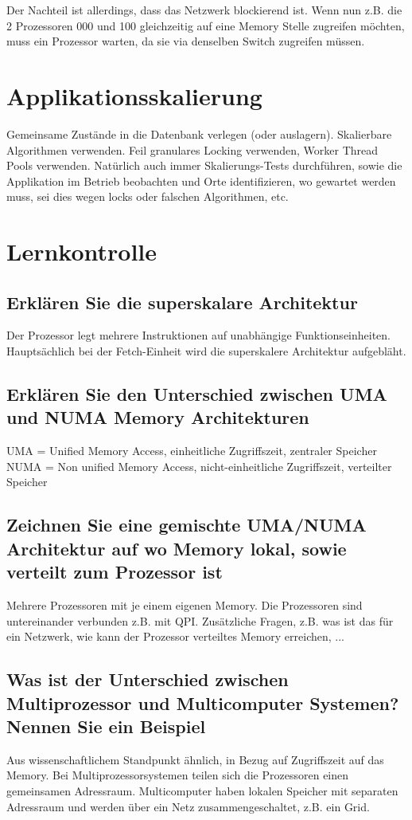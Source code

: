 Der Nachteil ist allerdings, dass das Netzwerk blockierend ist. Wenn nun z.B. die 2 Prozessoren 000 und 100 gleichzeitig auf eine Memory Stelle zugreifen möchten, muss ein Prozessor warten, da sie via denselben Switch zugreifen müssen.
\section{Applikationsskalierung}
Gemeinsame Zustände in die Datenbank verlegen (oder auslagern). Skalierbare Algorithmen verwenden. Feil granulares Locking verwenden, Worker Thread Pools verwenden. Natürlich auch immer Skalierungs-Tests durchführen, sowie die Applikation im Betrieb beobachten und Orte identifizieren, wo gewartet werden muss, sei dies wegen locks oder falschen Algorithmen, etc.
\section{Lernkontrolle}
\subsection{Erklären Sie die superskalare Architektur}
Der Prozessor legt mehrere Instruktionen auf unabhängige Funktionseinheiten.
Hauptsächlich bei der Fetch-Einheit wird die superskalere Architektur aufgebläht.
\subsection{Erklären Sie den Unterschied zwischen UMA und NUMA Memory Architekturen}
UMA = Unified Memory Access, einheitliche Zugriffszeit, zentraler Speicher
NUMA = Non unified Memory Access, nicht-einheitliche Zugriffszeit, verteilter Speicher
\subsection{Zeichnen Sie eine gemischte UMA/NUMA Architektur auf wo Memory lokal, sowie verteilt zum Prozessor ist}
Mehrere Prozessoren mit je einem eigenen Memory. Die Prozessoren sind untereinander verbunden z.B. mit QPI.
Zusätzliche Fragen, z.B. was ist das für ein Netzwerk, wie kann der Prozessor verteiltes Memory erreichen, ...
\subsection{Was ist der Unterschied zwischen Multiprozessor und Multicomputer Systemen? Nennen Sie ein Beispiel}
Aus wissenschaftlichem Standpunkt ähnlich, in Bezug auf Zugriffszeit auf das Memory.
Bei Multiprozessorsystemen teilen sich die Prozessoren einen gemeinsamen Adressraum.
Multicomputer haben lokalen Speicher mit separaten Adressraum und werden über ein Netz zusammengeschaltet, z.B. ein Grid.
